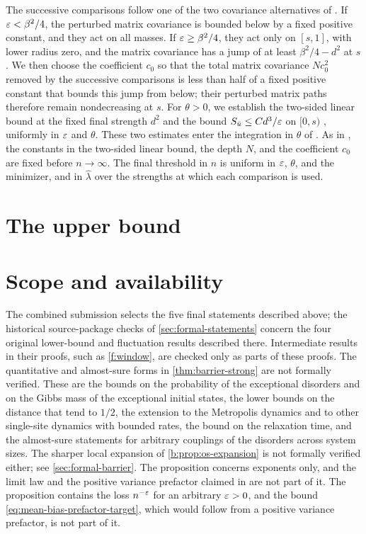 The successive comparisons follow one of the two covariance alternatives of \cite[Definition~6.1 and Corollary~6.7]{oai-fluctuations}. If $\varepsilon<\beta^2/4$, the perturbed matrix covariance is bounded below by a fixed positive constant, and they act on all masses. If $\varepsilon\ge\beta^2/4$, they act only on $[s,1]$, with lower radius zero, and the matrix covariance has a jump of at least $\beta^2/4-d^2$ at $s$. We then choose the coefficient $c_0$ so that the total matrix covariance $Nc_0^2$ removed by the successive comparisons is less than half of a fixed positive constant that bounds this jump from below; their perturbed matrix paths therefore remain nondecreasing at $s$. For $\theta>0$, we establish the two-sided linear bound at the fixed final strength $d^2$ \cite[Lemma~7.2]{oai-fluctuations} and the bound $S_{\bar u}\le Cd^3/\varepsilon$ on $[0,s)$ \cite[Lemma~7.3]{oai-fluctuations}, uniformly in $\varepsilon$ and $\theta$. These two estimates enter the integration in $\theta$ of \cite[Lemma~7.4]{oai-fluctuations}. As in \cite{oai-fluctuations}, the constants in the two-sided linear bound, the depth $N$, and the coefficient $c_0$ are fixed before $n\to\infty$. The final threshold in $n$ is uniform in $\varepsilon$, $\theta$, and the minimizer, and in ${\widehat\lambda}$ over the strengths at which each comparison is used.

\section{The upper bound}\label{sec:formal-upper}
\statusFormalUpper

\section{Scope and availability}\label{sec:formal-scope}

The combined submission selects the five final statements described above; the historical source-package checks of \cref{sec:formal-statements} concern the four original lower-bound and fluctuation results described there. Intermediate results in their proofs, such as \cref{f:window}, are checked only as parts of these proofs. The quantitative and almost-sure forms in \cref{thm:barrier-strong} are not formally verified. These are the bounds on the probability of the exceptional disorders and on the Gibbs mass of the exceptional initial states, the lower bounds on the distance that tend to $1/2$, the extension to the Metropolis dynamics and to other single-site dynamics with bounded rates, the bound on the relaxation time, and the almost-sure statements for arbitrary couplings of the disorders across system sizes. The sharper local expansion of \cref{b:prop:os-expansion} is not formally verified either; see \cref{sec:formal-barrier}. The proposition  concerns exponents only, and the limit law and the positive variance prefactor claimed in \cite{oai-limiting-law} are not part of it. The proposition  contains the loss $n^{-\varepsilon}$ for an arbitrary $\varepsilon>0$, and the bound \eqref{eq:mean-bias-prefactor-target}, which would follow from a positive variance prefactor, is not part of it.

